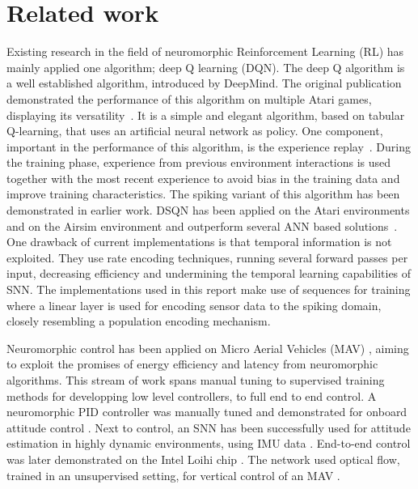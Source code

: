 \section{Related work} \label{section:lit_review} 
Existing research in the field of neuromorphic Reinforcement Learning (RL) has mainly applied one algorithm; deep Q learning (DQN). The deep Q algorithm is a well established algorithm, introduced by DeepMind. The original publication demonstrated the performance of this algorithm on multiple Atari games, displaying its versatility~\cite{mnih2013playing}. It is a simple and elegant algorithm, based on tabular Q-learning, that uses an artificial neural network as policy. One component, important in the performance of this algorithm, is the experience replay~\cite{fedus_revisiting_2020}. During the training phase, experience from previous environment interactions is used together with the most recent experience to avoid bias in the training data and improve training characteristics. The spiking variant of this algorithm has been demonstrated in earlier work. DSQN has been applied on the Atari environments and on the Airsim environment and outperform several ANN based solutions~\cite{DSQN_Atari, DQN_Atari_human-level_2022, DSQN_AirSim}. One drawback of current implementations is that temporal information is not exploited. They use rate encoding techniques, running several forward passes per input, decreasing efficiency and undermining the temporal learning capabilities of SNN. The implementations used in this report make use of sequences for training where a linear layer is used for encoding sensor data to the spiking domain, closely resembling a population encoding mechanism. 

Neuromorphic control has been applied on Micro Aerial Vehicles (MAV) \cite{Stroobants2022DesignProcessors, Stroobants2022NeuromorphicQuadrotors, Vitale2021Event-drivenChip, Paredes-Valles2023FullyFlight}, aiming to exploit the promises of energy efficiency and latency from neuromorphic algorithms. This stream of work spans manual tuning to supervised training methods for developping low level controllers, to full end to end control. A neuromorphic PID controller was manually tuned and demonstrated for onboard attitude control \cite{Stroobants2022DesignProcessors}. Next to control, an SNN has been successfully used for attitude estimation in highly dynamic environments, using IMU data \cite{Stroobants2022NeuromorphicQuadrotors}. End-to-end control was later demonstrated on the Intel Loihi chip \cite{Davies2018Loihi:Learning}. The network used optical flow, trained in an unsupervised setting, for vertical control of an MAV \cite{Paredes-Valles2023FullyFlight}.

